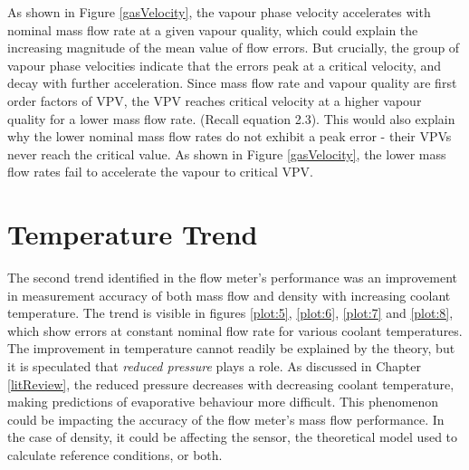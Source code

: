 \documentclass{report}
\begin{document}
As shown in Figure \ref{gasVelocity}, the vapour phase velocity accelerates with nominal mass flow rate at a given vapour quality, which could explain the increasing magnitude of the mean value of flow errors. But crucially, the group of vapour phase velocities indicate that the errors peak at a critical velocity, and decay with further acceleration. Since mass flow rate and vapour quality are first order factors of VPV, the VPV reaches critical velocity at a higher vapour quality for a lower mass flow rate. (Recall equation 2.3). This would also explain why the lower nominal mass flow rates do not exhibit a peak error - their VPVs never reach the critical value. As shown in Figure \ref{gasVelocity}, the lower mass flow rates fail to accelerate the vapour to critical VPV.
\section{Temperature Trend}
The second trend identified in the flow meter's performance was an improvement in measurement accuracy of both mass flow and density with increasing coolant temperature. The trend is visible in figures \ref{plot:5}, \ref{plot:6}, \ref{plot:7} and \ref{plot:8}, which show errors at constant nominal flow rate for various coolant temperatures. \\
The improvement in temperature cannot readily be explained by the theory, but it is speculated that \textit{reduced pressure} plays a role. As discussed in Chapter \ref{litReview}, the reduced pressure decreases with decreasing coolant temperature, making predictions of evaporative behaviour more difficult. This phenomenon could be impacting the accuracy of the flow meter's mass flow performance. In the case of density, it could be affecting the sensor, the theoretical model used to calculate reference conditions, or both.
\end{document}
